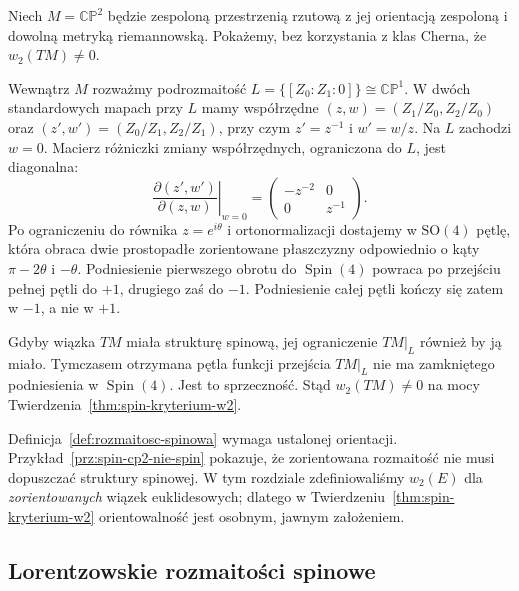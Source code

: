 \begin{przyklad}
\label{prz:spin-cp2-nie-spin}
Niech $M=\mathbb{CP}^2$ będzie zespoloną przestrzenią
rzutową z jej orientacją zespoloną i dowolną metryką
riemannowską. Pokażemy, bez korzystania z klas Cherna,
że $w_2(TM)\ne0$.

Wewnątrz $M$ rozważmy podrozmaitość
$L=\{[Z_0:Z_1:0]\}\cong\mathbb{CP}^1$.
W dwóch standardowych mapach przy $L$ mamy
współrzędne $(z,w)=(Z_1/Z_0,Z_2/Z_0)$ oraz
$(z',w')=(Z_0/Z_1,Z_2/Z_1)$, przy czym
$z'=z^{-1}$ i $w'=w/z$. Na $L$ zachodzi $w=0$.
Macierz różniczki zmiany współrzędnych,
ograniczona do $L$, jest diagonalna:
\[
 \left.\frac{\partial(z',w')}{\partial(z,w)}\right|_{w=0}
 =\begin{pmatrix}-z^{-2}&0\\0&z^{-1}\end{pmatrix}.
\]
Po ograniczeniu do równika $z=e^{i\theta}$
i ortonormalizacji dostajemy w $\mathrm{SO}(4)$
pętlę, która obraca dwie prostopadłe zorientowane
płaszczyzny odpowiednio o kąty
$\pi-2\theta$ i $-\theta$. Podniesienie pierwszego
obrotu do $\operatorname{Spin}(4)$ powraca po
przejściu pełnej pętli do $+1$, drugiego zaś
do $-1$. Podniesienie całej pętli kończy się
zatem w $-1$, a nie w $+1$.

Gdyby wiązka $TM$ miała strukturę spinową,
jej ograniczenie $TM|_L$ również by ją miało.
Tymczasem otrzymana pętla funkcji przejścia
$TM|_L$ nie ma zamkniętego podniesienia
w $\operatorname{Spin}(4)$. Jest to sprzeczność.
Stąd $w_2(TM)\ne0$ na mocy
Twierdzenia~\ref{thm:spin-kryterium-w2}.
\end{przyklad}

\begin{uwaga}
Definicja~\ref{def:rozmaitosc-spinowa} wymaga
ustalonej orientacji. Przykład~\ref{prz:spin-cp2-nie-spin}
pokazuje, że zorientowana rozmaitość nie musi
dopuszczać struktury spinowej. W tym rozdziale
zdefiniowaliśmy $w_2(E)$ dla \emph{zorientowanych}
wiązek euklidesowych; dlatego w
Twierdzeniu~\ref{thm:spin-kryterium-w2}
orientowalność jest osobnym, jawnym założeniem.
\end{uwaga}

\subsection{Lorentzowskie rozmaitości spinowe}

